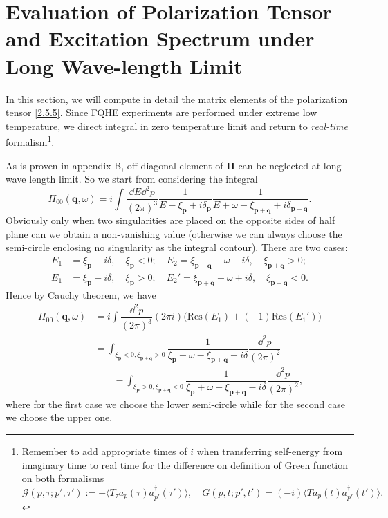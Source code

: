 \documentclass[bachelor,english,numbers]{ustcthesis}
\begin{document}
\chapter{Evaluation of Polarization Tensor and Excitation Spectrum under Long Wave-length Limit}
	In this section, we will compute in detail the matrix elements of the polarization tensor \eqref{2.5.5}. Since FQHE experiments are performed under extreme low temperature, we direct integral in zero temperature limit and return to \emph{real-time} formalism\footnote{Remember to add appropriate times of $i$ when transferring self-energy from imaginary time to real time for the difference on definition of Green function on both formalisms
	\begin{equation*}
		\mathcal{G}(p,\tau;p',\tau'):=-\langle T_\tau a_p(\tau) a_{p'}^\dagger(\tau')\rangle,\quad G(p,t;p',t')=(-i)\langle Ta_p(t) a_{p'}^\dagger(t')\rangle.
	\end{equation*}}.\par
	As is proven in appendix B, off-diagonal element of $\bm{\Pi}$ can be neglected at long wave length limit. So we start from considering the integral
	\begin{equation*}
		\Pi_{00}(\bm{q},\omega)=i\int\dfrac{\dd E\dd^2p}{(2\pi)^3}\dfrac{1}{E-\xi_{\bm{p}}+i\delta_{\bm{p}}}\dfrac{1}{E+\omega-\xi_{\bm{p+q}}+i\delta_{\bm{p+q}}}.
	\end{equation*}
	Obviously only when two singularities are placed on the opposite sides of half plane can we obtain a non-vanishing value (otherwise we can always choose the semi-circle enclosing no singularity as the integral contour). There are two cases:
	\begin{align*}
		E_1&=\xi_{\bm{p}}+i\delta,\quad\xi_{\bm{p}}<0;\quad	E_2=\xi_{\bm{p+q}}-\omega-i\delta,\quad\xi_{\bm{p+q}}>0;\\
		E_1&=\xi_{\bm{p}}-i\delta,\quad\xi_{\bm{p}}>0;\quad E_2'=\xi_{\bm{p+q}}-\omega+i\delta,\quad\xi_{\bm{p+q}}<0.
	\end{align*}
	Hence by Cauchy theorem, we have
	\begin{align}
		\Pi_{00}(\bm{q},\omega)&=i\int\dfrac{\dd^2p}{(2\pi)^3}(2\pi i)\bigg(\mathrm{Res}(E_1)+(-1)\mathrm{Res}(E_1')\bigg)\nonumber\\
		&=\int_{\xi_{\bm{p}}<0,\xi_{\bm{p+q}}>0}\dfrac{1}{\xi_{\bm{p}}+\omega-\xi_{\bm{p+q}}+i\delta}\dfrac{\dd^2p}{(2\pi)^2}\nonumber\\
		&\qquad-\int_{\xi_{\bm{p}}>0,\xi_{\bm{p+q}}<0}\dfrac{1}{\xi_{\bm{p}}+\omega-\xi_{\bm{p+q}}-i\delta}\dfrac{\dd^2p}{(2\pi)^2},\label{3.2.1}
	\end{align}
	where for the first case we choose the lower semi-circle while for the second case we choose the upper one.
\end{document}
